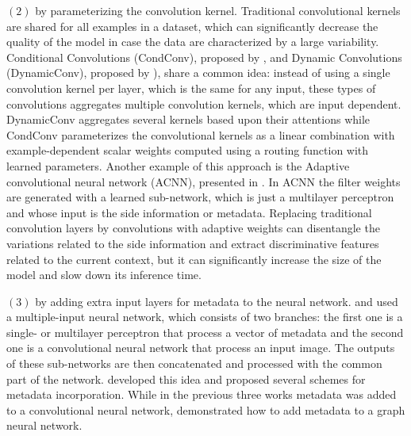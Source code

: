   $(2)$  by parameterizing the convolution kernel. Traditional convolutional kernels are shared for all examples in a dataset, which can significantly decrease the quality of the model in case the data are characterized by a large variability. Conditional Convolutions (CondConv), proposed by \cite{CondConv2020}, and Dynamic Convolutions (DynamicConv), proposed by \cite{DynamicConv2020}), share a common idea: instead of using a single convolution kernel per layer, which is the same for any input, these types of convolutions aggregates multiple convolution kernels, which are input dependent. DynamicConv aggregates several kernels based upon their attentions while CondConv parameterizes the convolutional kernels as a linear combination with example-dependent scalar weights computed using a routing function with learned parameters. Another example of this approach is the Adaptive convolutional neural network (ACNN), presented in \cite{AdaptiveConvolutions2017}. In ACNN the filter weights are generated with a learned sub-network, which is just a multilayer perceptron and whose input is the side information or metadata. Replacing traditional convolution layers by convolutions with adaptive weights can disentangle the variations related to the side information and extract discriminative features related to the current context, but it can significantly increase the size of the model and slow down its inference time.  

  $(3)$  by adding extra input layers for metadata to the neural network. \cite{MultipleInputNN_Water2020} and \cite{EfficientNetMetaData2020} used a multiple-input neural network, which consists of two branches: the first one is a single- or multilayer perceptron that process a vector of metadata and the second one is a convolutional neural network that process an input image. The outputs of these sub-networks are then concatenated and processed with the common part of the network. \cite{Plankton2019} developed this idea and proposed several schemes for metadata incorporation. While in the previous three works metadata was added to a convolutional neural network, \cite{GCN2021covid19} demonstrated how to add metadata to a graph neural network.
  


  
